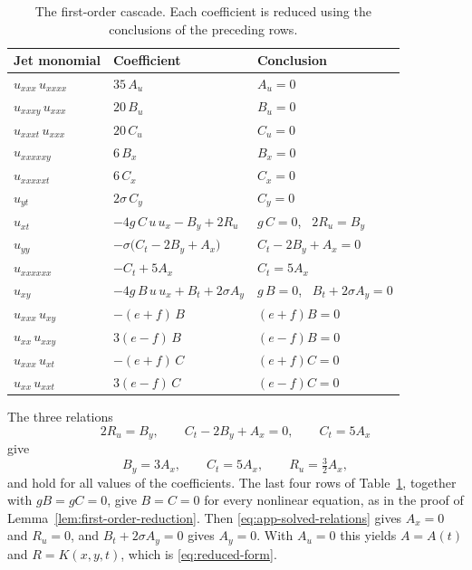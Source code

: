 \documentclass[11pt]{article}
\numberwithin{equation}{section}
\theoremstyle{definition}
\theoremstyle{remark}
\begin{document}
\begin{table}[h]
\centering
\begin{tabular}{lll}
\hline
Jet monomial & Coefficient & Conclusion \\
\hline
$u_{xxx}\,u_{xxxx}$ & $35\,A_u$ & $A_u=0$ \\
$u_{xxxy}\,u_{xxx}$ & $20\,B_u$ & $B_u=0$ \\
$u_{xxxt}\,u_{xxx}$ & $20\,C_u$ & $C_u=0$ \\
$u_{xxxxxy}$ & $6\,B_x$ & $B_x=0$ \\
$u_{xxxxxt}$ & $6\,C_x$ & $C_x=0$ \\
$u_{yt}$ & $2\sigma\,C_y$ & $C_y=0$ \\
$u_{xt}$ & $-4g\,C\,u\,u_x - B_y + 2R_u$
 & $g\,C=0$, \ $2R_u=B_y$ \\
$u_{yy}$ & $-\sigma\bigl(C_t-2B_y+A_x\bigr)$
 & $C_t-2B_y+A_x=0$ \\
$u_{xxxxxx}$ & $-C_t+5A_x$ & $C_t=5A_x$ \\
$u_{xy}$ & $-4g\,B\,u\,u_x + B_t + 2\sigma A_y$
 & $g\,B=0$, \ $B_t+2\sigma A_y=0$ \\
$u_{xxx}\,u_{xy}$ & $-(e+f)\,B$ & $(e+f)B=0$ \\
$u_{xx}\,u_{xxy}$ & $3(e-f)\,B$ & $(e-f)B=0$ \\
$u_{xxx}\,u_{xt}$ & $-(e+f)\,C$ & $(e+f)C=0$ \\
$u_{xx}\,u_{xxt}$ & $3(e-f)\,C$ & $(e-f)C=0$ \\
\hline
\end{tabular}
\caption{The first-order cascade. Each coefficient is reduced using
the conclusions of the preceding rows.}
\label{tab:cascade}
\end{table}

The three relations
\begin{equation}
2R_u = B_y,
\qquad
C_t - 2B_y + A_x = 0,
\qquad
C_t = 5A_x
\label{eq:app-three-relations}
\end{equation}
give
\begin{equation}
B_y = 3A_x,
\qquad
C_t = 5A_x,
\qquad
R_u = \tfrac32 A_x ,
\label{eq:app-solved-relations}
\end{equation}
and hold for all values of the coefficients. The last four rows of
Table~\ref{tab:cascade}, together with $gB=gC=0$, give $B=C=0$ for
every nonlinear equation, as in the proof of
Lemma~\ref{lem:first-order-reduction}. Then
\eqref{eq:app-solved-relations} gives $A_x=0$ and $R_u=0$, and
$B_t+2\sigma A_y=0$ gives $A_y=0$. With $A_u=0$ this yields
$A=A(t)$ and $R=K(x,y,t)$, which is \eqref{eq:reduced-form}.



\end{document}
